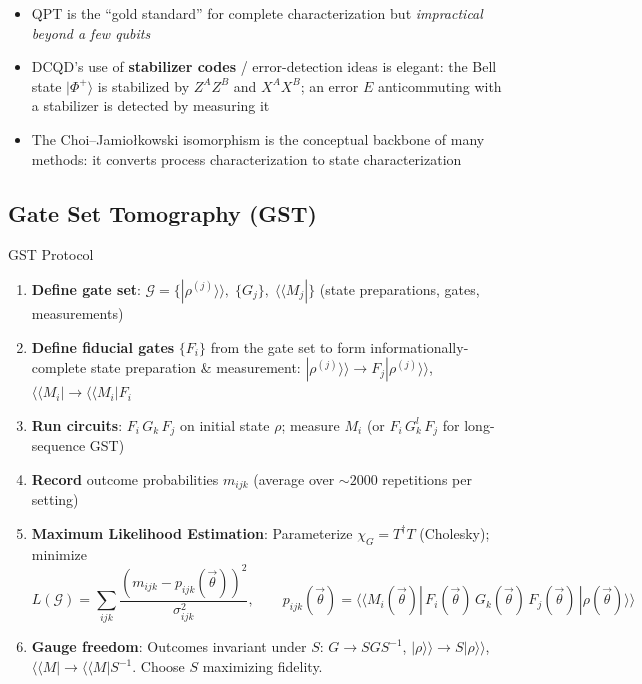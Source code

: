 \documentclass[10pt,a4paper]{article}
\begin{document}
\begin{insightbox}
\begin{itemize}
  \item QPT is the ``gold standard'' for complete characterization but \emph{impractical beyond a few qubits}
  \item DCQD's use of \textbf{stabilizer codes} / error-detection ideas is elegant: the Bell state $|\Phi^+\rangle$ is stabilized by $Z^AZ^B$ and $X^AX^B$; an error $E$ anticommuting with a stabilizer is detected by measuring it
  \item The Choi--Jamio\l{}kowski isomorphism is the conceptual backbone of many methods: it converts process characterization to state characterization
\end{itemize}
\end{insightbox}

\newpage

\subsection{Gate Set Tomography (GST)}

\begin{algorithmbox}{GST Protocol}
\begin{enumerate}
  \item \textbf{Define gate set}: $\mathcal{G} = \{|\rho^{(j)}\rangle\!\rangle, \; \{G_j\}, \; \langle\!\langle M_j|\}$ (state preparations, gates, measurements)
  \item \textbf{Define fiducial gates} $\{F_i\}$ from the gate set to form informationally-complete state preparation \& measurement: $|\rho^{(j)}\rangle\!\rangle \to F_j |\rho^{(j)}\rangle\!\rangle$, $\langle\!\langle M_i| \to \langle\!\langle M_i| F_i$
  \item \textbf{Run circuits}: $F_i\, G_k\, F_j$ on initial state $\rho$; measure $M_i$ \hfill (or $F_i\, G_k^l\, F_j$ for long-sequence GST)
  \item \textbf{Record} outcome probabilities $m_{ijk}$ (average over $\sim 2000$ repetitions per setting)
  \item \textbf{Maximum Likelihood Estimation}: Parameterize $\chi_G = T^\dagger T$ (Cholesky); minimize
  \[
    L(\mathcal{G}) = \sum_{ijk} \frac{(m_{ijk} - p_{ijk}(\vec{\theta}))^2}{\sigma_{ijk}^2}, \qquad p_{ijk}(\vec{\theta}) = \langle\!\langle M_i(\vec{\theta})| \, F_i(\vec{\theta})\, G_k(\vec{\theta})\, F_j(\vec{\theta}) \, |\rho(\vec{\theta})\rangle\!\rangle
  \]
  \item \textbf{Gauge freedom}: Outcomes invariant under $S$: $G \to S G S^{-1}$, $|\rho\rangle\!\rangle \to S|\rho\rangle\!\rangle$, $\langle\!\langle M| \to \langle\!\langle M|S^{-1}$. Choose $S$ maximizing fidelity.
\end{enumerate}
\end{algorithmbox}
\end{document}
